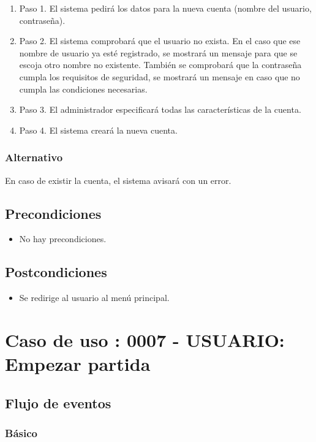 \begin{enumerate}
\item Paso 1.
El sistema pedirá los datos para la nueva cuenta (nombre del usuario, contraseña).
\item Paso 2.
El sistema comprobará que el usuario no exista. En el caso que ese nombre de usuario ya esté registrado, se mostrará un mensaje para que se escoja otro nombre no existente. También se comprobará que la contraseña cumpla los requisitos de seguridad, se mostrará un mensaje en caso que no cumpla las condiciones necesarias.
\item Paso 3.
El administrador especificará todas las características de la cuenta.
\item Paso 4.
El sistema creará la nueva cuenta.
\end{enumerate}

\subsubsection{Alternativo}
En caso de existir la cuenta, el sistema avisará con un error.

\subsection{Precondiciones}
\begin{itemize}
\item No hay precondiciones.
\end{itemize}

\subsection{Postcondiciones}
\begin{itemize}
\item Se redirige al usuario al menú principal.
\end{itemize}



\section{Caso de uso : 0007 - USUARIO: Empezar partida}\label{sec:uc0}
\subsection{Flujo de eventos}
\subsubsection{Básico}

